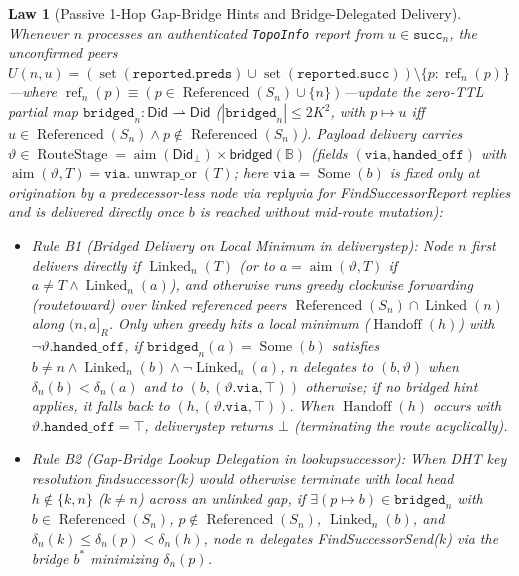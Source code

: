 \documentclass[journal]{IEEEtran}
\newtheorem{law}{Law}
\DeclareRobustCommand{\code}[1]{{\ttfamily\renewcommand{\_}{\textunderscore\allowbreak}#1}}
\begin{document}
\begin{law}[Passive 1-Hop Gap-Bridge Hints and Bridge-Delegated Delivery]\label{law:bridge-delivery}
Whenever $n$ processes an authenticated \texttt{TopoInfo} report from
$u\in\texttt{succ}_n$, the unconfirmed peers $U(n,u)=(\operatorname{set}(\texttt{reported.preds})\cup\operatorname{set}(\texttt{reported.succ}))\setminus\{p:\operatorname{ref}_n(p)\}$---where $\operatorname{ref}_n(p)\equiv (p\in\operatorname{Referenced}(S_n)\cup\{n\})$---update the zero-TTL partial map $\texttt{bridged}_n:\mathsf{Did}\rightharpoonup\mathsf{Did}$ ($|\texttt{bridged}_n|\le 2K^2$, with $p\mapsto u$ iff $u\in\operatorname{Referenced}(S_n)\land p\notin\operatorname{Referenced}(S_n)$).
Payload delivery carries $\vartheta\in\operatorname{RouteStage}=\operatorname{aim}(\mathsf{Did}_{\bot})\times\mathsf{bridged}(\mathbb{B})$ (fields $(\texttt{via},\texttt{handed\_off})$ with $\operatorname{aim}(\vartheta,T)=\texttt{via}.\operatorname{unwrap\_or}(T)$; here $\texttt{via}=\operatorname{Some}(b)$ is fixed only at origination by a predecessor-less node via \code{reply\_via} for \code{FindSuccessorReport} replies and is delivered directly once $b$ is reached without mid-route mutation):
\begin{itemize}[leftmargin=1.5em]
\item \emph{Rule B1 (Bridged Delivery on Local Minimum in \code{delivery\_step}):} Node $n$ first delivers directly if $\operatorname{Linked}_n(T)$ (or to $a=\operatorname{aim}(\vartheta,T)$ if $a\neq T\land\operatorname{Linked}_n(a)$), and otherwise runs greedy clockwise forwarding (\code{route\_toward}) over linked referenced peers $\operatorname{Referenced}(S_n)\cap\operatorname{Linked}(n)$ along $(n,a]_R$. Only when greedy hits a local minimum ($\operatorname{Handoff}(h)$) with $\neg\vartheta.\texttt{handed\_off}$, if $\texttt{bridged}_n(a)=\operatorname{Some}(b)$ satisfies $b\neq n\land\operatorname{Linked}_n(b)\land\neg\operatorname{Linked}_n(a)$, $n$ delegates to $(b,\vartheta)$ when $\delta_n(b)<\delta_n(a)$ and to $(b,(\vartheta.\texttt{via},\top))$ otherwise; if no bridged hint applies, it falls back to $(h,(\vartheta.\texttt{via},\top))$. When $\operatorname{Handoff}(h)$ occurs with $\vartheta.\texttt{handed\_off}=\top$, \code{delivery\_step} returns $\bot$ (terminating the route acyclically).
\item \emph{Rule B2 (Gap-Bridge Lookup Delegation in \code{lookup\_successor}):} When DHT key resolution \code{find\_successor}($k$) would otherwise terminate with local head $h\notin\{k,n\}$ ($k\neq n$) across an unlinked gap, if $\exists(p\mapsto b)\in\texttt{bridged}_n$ with $b\in\operatorname{Referenced}(S_n)$, $p\notin\operatorname{Referenced}(S_n)$, $\operatorname{Linked}_n(b)$, and $\delta_n(k)\le\delta_n(p)<\delta_n(h)$, node $n$ delegates \code{FindSuccessorSend}($k$) via the bridge $b^*$ minimizing $\delta_n(p)$.
\end{itemize}
\end{law}
\end{document}
